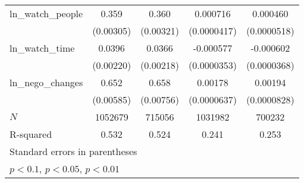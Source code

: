 {\begin{tabular}{l*{4}{c}}
\addlinespace
ln\_watch\_people&       0.359\sym{***}&       0.360\sym{***}&    0.000716\sym{***}&    0.000460\sym{***}\\
            &   (0.00305)         &   (0.00321)         & (0.0000417)         & (0.0000518)         \\
\addlinespace
ln\_watch\_time&      0.0396\sym{***}&      0.0366\sym{***}&   -0.000577\sym{***}&   -0.000602\sym{***}\\
            &   (0.00220)         &   (0.00218)         & (0.0000353)         & (0.0000368)         \\
\addlinespace
ln\_nego\_changes&       0.652\sym{***}&       0.658\sym{***}&     0.00178\sym{***}&     0.00194\sym{***}\\
            &   (0.00585)         &   (0.00756)         & (0.0000637)         & (0.0000828)         \\
\midrule
\(N\)       &     1052679         &      715056         &     1031982         &      700232         \\
R-squared   &       0.532         &       0.524         &       0.241         &       0.253         \\
\bottomrule
\multicolumn{5}{l}{\footnotesize Standard errors in parentheses}\\
\multicolumn{5}{l}{\footnotesize \sym{*} \(p<0.1\), \sym{**} \(p<0.05\), \sym{***} \(p<0.01\)}\\
\end{tabular}
}
